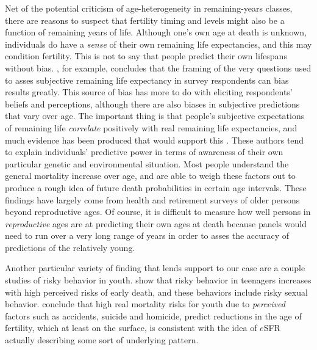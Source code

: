 Net of the potential criticism of age-heterogeneity in remaining-years classes,
there are reasons to suspect that fertility timing and levels might also be
a function of remaining years of life. Although one's own age at death is
unknown, individuals do have a \textit{sense} of their own remaining life
expectancies, and this may condition fertility. This is not to say that people 
predict their own lifespans without bias. \citet{payne2013life}, for example,
concludes that the framing of the very questions used to asses subjective
remaining life expectancy in survey respondents can bias results greatly. This
source of bias has more to do with eliciting respondents' beliefs and
perceptions, although there are also biases in subjective predictions that vary
over age. The important thing is that people's subjective expectations of
remaining life \textit{correlate} positively with real remaining life
expectancies, and much evidence has been produced that would support
this \citep{hurd1995evaluation, mirowsky1999subjective, hurd2002predictive,
perozek2008using, delavande2011differential, post2012longevity}. These authors
tend to explain individuals' predictive power in terms of awareness of
their own particular genetic and environmental situation. Most people
understand the general mortality increase over age, and are able to
weigh these factors out to produce a rough idea of future death 
probabilities in certain age intervals. These findings have largely come from
health and retirement surveys of older persons beyond reproductive ages. Of
course, it is difficult to measure how well persons in \textit{reproductive}
ages are at predicting their own ages at death because panels would need to
run over a very long range of years in order to asses the accuracy of
predictions of the relatively young. 

Another particular variety of finding that lends support to our case are
a couple studies of risky behavior in youth. \citet{borowsky2009health} show
that risky behavior in teenagers increases with high perceived risks of early death, and these
behaviors include risky sexual behavior. \citet{wilson1997life} conclude that
high real mortality risks for youth due to \textit{perceived} factors such as 
accidents, suicide and homicide, predict reductions in the age of fertility, which at
least on the surface, is consistent with the idea of $e$SFR actually describing 
some sort of underlying pattern. 

